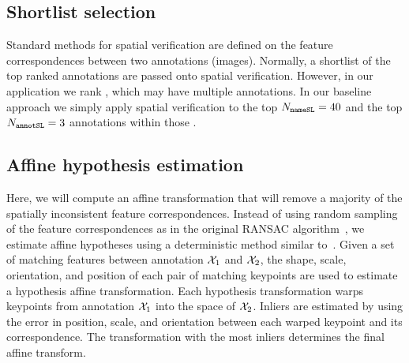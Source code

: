 
     \sver{}

    \subsection{Shortlist selection}
        Standard methods for spatial verification are defined on the feature correspondences between two
        annotations (images). Normally, a shortlist of the top ranked annotations are passed onto spatial
        verification. However, in our application we rank \names{}, which may have multiple annotations. In our
        baseline approach we simply apply spatial verification to the top $N_{\tt{nameSL}}=40$ \names{} and the top
        $N_{\tt{annotSL}}=3$ annotations within those \names{}.

    \subsection{Affine hypothesis estimation}
        Here, we will compute an affine transformation that will remove a majority of the spatially inconsistent
        feature correspondences. Instead of using random sampling of the feature correspondences as in the original
        RANSAC algorithm~\cite{hartley_multiple_2003}, we estimate affine hypotheses using a deterministic method
        similar to~\cite{philbin_object_2007, chum_homography_2012}. Given a set of matching features between
        annotation $\mathcal{X}_{1}$ and $\mathcal{X}_{2}$, the shape, scale, orientation, and position of each pair of matching
        keypoints are used to estimate a hypothesis affine transformation. Each hypothesis transformation warps
        keypoints from annotation $\mathcal{X}_{1}$ into the space of $\mathcal{X}_{2}$. Inliers are estimated by using the error
        in position, scale, and orientation between each warped keypoint and its correspondence. The transformation
        with the most inliers determines the final affine transform.

        \newcommand{\AffMat}{\mat{A}}
        \newcommand{\HypothSet}{\set{A}}
        \newcommand{\AffMatij}{\mat{A}_{i, j}}
        \newcommand{\HypothAffMat}{\hat{\mat{A}}}

